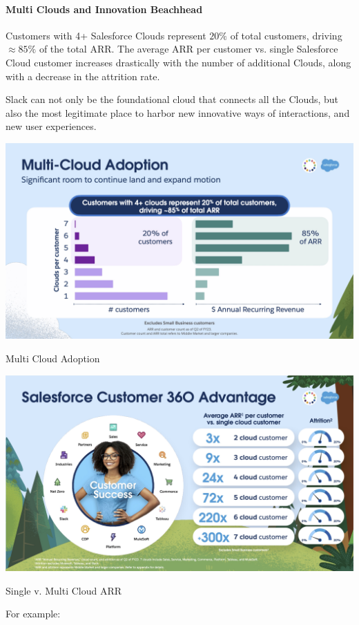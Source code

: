 \documentclass{tufte-handout}
\begin{document}
\paragraph{Multi Clouds and Innovation Beachhead}\label{sec:multi-clouds} Customers with 4+ Salesforce Clouds represent $20\%$ of total customers, driving $\approx 85\%$ of the total ARR. The average ARR per customer vs. single Salesforce Cloud customer increases drastically with the number of additional Clouds, along with a decrease in the attrition rate. \par
Slack can not only be the foundational cloud that connects all the Clouds, but also the most legitimate place to harbor new innovative ways of interactions, and new user experiences.
\begin{marginfigure}[-150pt]
  \includegraphics{salesforce-22}
  \caption{Multi Cloud Adoption}
\end{marginfigure}
 \begin{marginfigure}[-40pt]
  \includegraphics{salesforce-23}
  \caption{Single v. Multi Cloud ARR}
\end{marginfigure}
For example:
\end{document}
